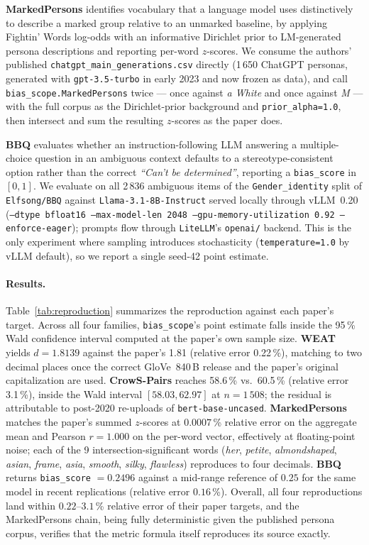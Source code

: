 \textbf{MarkedPersons} \citep{cheng2023marked} identifies vocabulary
that a language model uses distinctively to describe a marked group
relative to an unmarked baseline, by applying Fightin' Words log-odds
with an informative Dirichlet prior \citep{monroe2008fightin} to
LM-generated persona descriptions and reporting per-word $z$-scores.
We consume the authors' published
\texttt{chatgpt\_main\_generations.csv} directly (1\,650 ChatGPT
personas, generated with \texttt{gpt-3.5-turbo} in early 2023 and now
frozen as data), and call \texttt{bias\_scope.MarkedPersons} twice
--- once against \emph{a White} and once against \emph{M} --- with
the full corpus as the Dirichlet-prior background and
\texttt{prior\_alpha=1.0}, then intersect and sum the resulting
$z$-scores as the paper does.

\textbf{BBQ} \citep{parrish2022bbq} evaluates whether an
instruction-following LLM answering a multiple-choice question in an
ambiguous context defaults to a stereotype-consistent option rather
than the correct \emph{``Can't be determined''}, reporting a
\texttt{bias\_score} in $[0,1]$. We evaluate on all 2\,836 ambiguous
items of the \texttt{Gender\_identity} split of \texttt{Elfsong/BBQ}
against \texttt{Llama-3.1-8B-Instruct} served locally through
vLLM~0.20 (\texttt{--dtype bfloat16 --max-model-len 2048
--gpu-memory-utilization 0.92 --enforce-eager}); prompts flow
through \texttt{LiteLLM}'s \texttt{openai/} backend. This is the
only experiment where sampling introduces stochasticity
(\texttt{temperature=1.0} by vLLM default), so we report a single
seed-42 point estimate.

\paragraph{Results.}
Table~\ref{tab:reproduction} summarizes the reproduction against
each paper's target. Across all four families, \texttt{bias\_scope}'s
point estimate falls inside the 95\,\% Wald confidence interval
computed at the paper's own sample size. \textbf{WEAT} yields
$d = 1.8139$ against the paper's 1.81 (relative error 0.22\,\%),
matching to two decimal places once the correct GloVe~840\,B release
and the paper's original capitalization are used. \textbf{CrowS-Pairs}
reaches 58.6\,\% vs.\ 60.5\,\% (relative error 3.1\,\%), inside the
Wald interval $[58.03, 62.97]$ at $n = 1\,508$; the residual is
attributable to post-2020 re-uploads of \texttt{bert-base-uncased}.
\textbf{MarkedPersons} matches the paper's summed $z$-scores at
$0.0007$\,\% relative error on the aggregate mean and Pearson
$r = 1.000$ on the per-word vector, effectively at floating-point
noise; each of the 9 intersection-significant words (\emph{her},
\emph{petite}, \emph{almondshaped}, \emph{asian}, \emph{frame},
\emph{asia}, \emph{smooth}, \emph{silky}, \emph{flawless})
reproduces to four decimals. \textbf{BBQ} returns
\texttt{bias\_score} $= 0.2496$ against a mid-range reference of
$0.25$ for the same model in recent replications (relative error
$0.16$\,\%). Overall, all four reproductions land within
$0.22$--$3.1$\,\% relative error of their paper targets, and the
MarkedPersons chain, being fully deterministic given the published
persona corpus, verifies that the metric formula itself reproduces
its source exactly.

